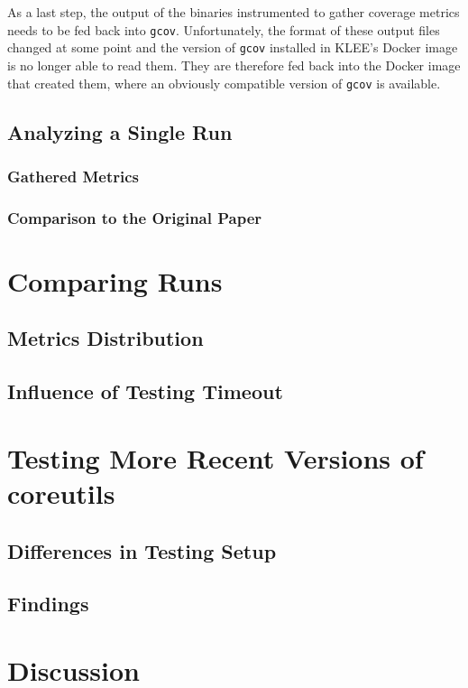 \documentclass{article}
\begin{document}
\begin{multicols}{2}
    As a last step, the output of the binaries instrumented to gather coverage metrics needs to be fed back into \lstinline{gcov}. Unfortunately, the format of these output files changed at some point and the version of \lstinline{gcov} installed in KLEE's Docker image is no longer able to read them. They are therefore fed back into the Docker image that created them, where an obviously compatible version of \lstinline{gcov} is available.

    \pagebreak

    \subsection{Analyzing a Single Run}
    \subsubsection{Gathered Metrics}
    \subsubsection{Comparison to the Original Paper}

    \section{Comparing Runs}
    \label{Timeouts}
    \subsection{Metrics Distribution}
    \subsection{Influence of Testing Timeout}

    \section{Testing More Recent Versions of coreutils}
    \label{SoftwareEvolution}
    \subsection{Differences in Testing Setup}
    \subsection{Findings}

    \section{Discussion}

\end{multicols}
\end{document}
